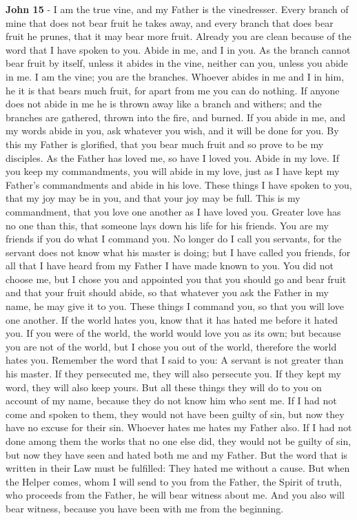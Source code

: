 \documentclass[11pt]{article}
\begin{document}
\textbf{John 15} - I am the true vine, and my Father is the vinedresser.  Every branch of mine that does not bear fruit he takes away, and every branch that does bear fruit he prunes, that it may bear more fruit.  Already you are clean because of the word that I have spoken to you.  Abide in me, and I in you. As the branch cannot bear fruit by itself, unless it abides in the vine, neither can you, unless you abide in me.  I am the vine; you are the branches. Whoever abides in me and I in him, he it is that bears much fruit, for apart from me you can do nothing.  If anyone does not abide in me he is thrown away like a branch and withers; and the branches are gathered, thrown into the fire, and burned.  If you abide in me, and my words abide in you, ask whatever you wish, and it will be done for you.  By this my Father is glorified, that you bear much fruit and so prove to be my disciples.  As the Father has loved me, so have I loved you. Abide in my love.  If you keep my commandments, you will abide in my love, just as I have kept my Father's commandments and abide in his love.  These things I have spoken to you, that my joy may be in you, and that your joy may be full.  This is my commandment, that you love one another as I have loved you.  Greater love has no one than this, that someone lays down his life for his friends.  You are my friends if you do what I command you.  No longer do I call you servants, for the servant does not know what his master is doing; but I have called you friends, for all that I have heard from my Father I have made known to you.  You did not choose me, but I chose you and appointed you that you should go and bear fruit and that your fruit should abide, so that whatever you ask the Father in my name, he may give it to you.  These things I command you, so that you will love one another.  If the world hates you, know that it has hated me before it hated you.  If you were of the world, the world would love you as its own; but because you are not of the world, but I chose you out of the world, therefore the world hates you.  Remember the word that I said to you: A servant is not greater than his master. If they persecuted me, they will also persecute you. If they kept my word, they will also keep yours.  But all these things they will do to you on account of my name, because they do not know him who sent me.  If I had not come and spoken to them, they would not have been guilty of sin, but now they have no excuse for their sin.  Whoever hates me hates my Father also.  If I had not done among them the works that no one else did, they would not be guilty of sin, but now they have seen and hated both me and my Father.  But the word that is written in their Law must be fulfilled: They hated me without a cause.  But when the Helper comes, whom I will send to you from the Father, the Spirit of truth, who proceeds from the Father, he will bear witness about me.  And you also will bear witness, because you have been with me from the beginning.
\end{document}
